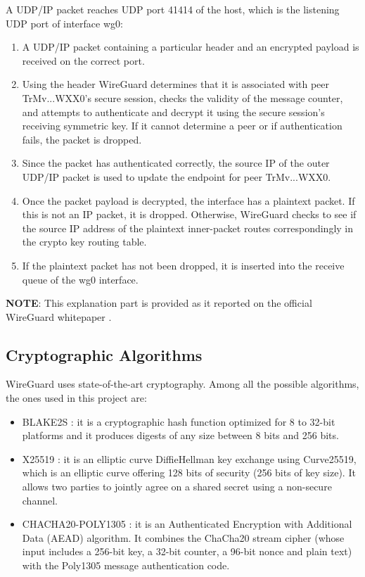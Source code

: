 A UDP/IP packet reaches UDP port 41414 of the host, which is the listening UDP port of interface wg0:
\begin{enumerate}
    \item A UDP/IP packet containing a particular header and an encrypted payload is received on the correct port.
    \item Using the header WireGuard determines that it is associated with peer TrMv...WXX0’s secure session, checks the validity of the message counter, and attempts to authenticate and decrypt it using the secure session’s receiving symmetric key. If it cannot determine a peer or if authentication fails, the packet is dropped.
    \item Since the packet has authenticated correctly, the source IP of the outer UDP/IP packet is used to update the endpoint for peer TrMv...WXX0.
    \item Once the packet payload is decrypted, the interface has a plaintext packet. If this is not an IP packet, it is dropped. Otherwise, WireGuard checks to see if the source IP address of the plaintext inner-packet routes correspondingly in the crypto key routing table.
    \item If the plaintext packet has not been dropped, it is inserted into the receive queue of the wg0 interface.
\end{enumerate}

\textbf{NOTE}: This explanation part is provided as it reported on the official WireGuard whitepaper \cite{WireGuard}. 

\subsection{Cryptographic Algorithms}\label{sec:WGAlgo}
WireGuard uses state-of-the-art cryptography. Among all the possible algorithms, the ones used in this project are:
\begin{itemize}
    \item BLAKE2S : it is a cryptographic hash function optimized for 8 to 32-bit platforms and it produces digests of any size between 8 bits and 256 bits.
    \item X25519 : it is an elliptic curve DiffieHellman key exchange using Curve25519, which is an elliptic curve offering 128 bits of security (256 bits of key size). It allows two parties to jointly agree on a shared secret using a non-secure channel.
    \item CHACHA20-POLY1305 : it is an Authenticated Encryption with Additional Data (AEAD) algorithm. It combines the ChaCha20 stream cipher (whose input includes a 256-bit key, a 32-bit counter, a 96-bit nonce and plain text) with the Poly1305 message authentication code.
\end{itemize}
